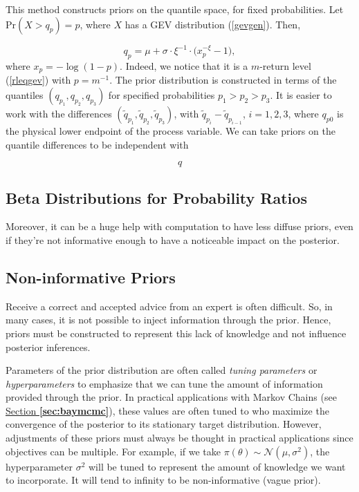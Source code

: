 This method constructs priors on the quantile space, for fixed probabilities. Let $\text{Pr}(X>q_p)=p$, where $X$ has a GEV distribution (\ref{gevgen}). Then,

\begin{equation}
q_p=\mu + \sigma\cdot\xi^{-1}\cdot\big(x_p^{-\xi}-1\big),
\end{equation}
where $x_p=-\log (1-p)$. Indeed, we notice that it is a $m$-return level (\ref{rleqgev}) with $p=m^{-1}$. The prior distribution is constructed in terms of the quantiles $(q_{p_1},q_{p_2}, q_{p_3})$ for specified probabilities $p_1>p_2>p_3$. It is easier to work with the differences $(\tilde{q}_{p_1},\tilde{q}_{p_2}, \tilde{q}_{p_3})$, with $\tilde{q}_{p_i}-\tilde{q}_{p_{i-1}}$, $i=1,2,3$, where $q_{p0}$ is the physical lower endpoint of the process variable. We can take priors on the quantile differences to be independent with 

\begin{equation}
q
\end{equation}


\subsection{Beta Distributions for Probability Ratios}






Moreover, it can be a huge help with computation to have less diffuse priors, even
if they're not informative enough to have a noticeable impact on the posterior.


\subsection{Non-informative Priors}

Receive a correct and accepted advice from an expert is often difficult.
So, in many cases, it is not possible to inject information through the prior. 
Hence, priors must be constructed to represent this lack of knowledge and not influence posterior inferences. 

Parameters of the prior distribution are often called \emph{tuning parameters} or \emph{hyperparameters} to emphasize that we can tune the amount of information provided through the prior. In practical applications with  Markov Chains (see \hyperref[sec:baymcmc]{Section \textbf{\ref{sec:baymcmc}}}), these values are often tuned to who maximize the convergence of the posterior to its stationary target distribution. However, adjustments of these priors must always be thought in practical applications since objectives can be multiple. For example, if we take $\pi(\theta)\sim\mathcal{N}(\mu,\sigma^2)$,  the hyperparameter $\sigma^2$ will be tuned to represent the amount of knowledge we want to incorporate. It will tend to infinity to be non-informative (vague prior).



